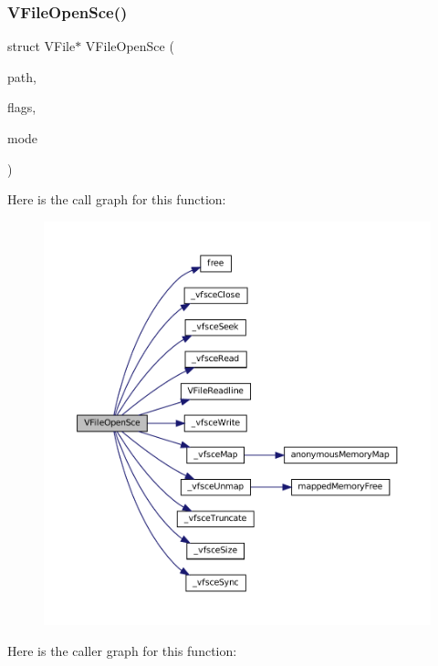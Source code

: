 \subsubsection{\texorpdfstring{V\+File\+Open\+Sce()}{VFileOpenSce()}}
{\footnotesize\ttfamily struct V\+File$\ast$ V\+File\+Open\+Sce (\begin{DoxyParamCaption}\item[{const char $\ast$}]{path,  }\item[{\mbox{\hyperlink{ioapi_8h_a787fa3cf048117ba7123753c1e74fcd6}{int}}}]{flags,  }\item[{Sce\+Mode}]{mode }\end{DoxyParamCaption})}

Here is the call graph for this function\+:
\nopagebreak
\begin{figure}[H]
\begin{center}
\leavevmode
\includegraphics[width=350pt]{sce-vfs_8c_ad40fac94880c0fb95185d3d03f43234b_cgraph}
\end{center}
\end{figure}
Here is the caller graph for this function\+:
\nopagebreak

